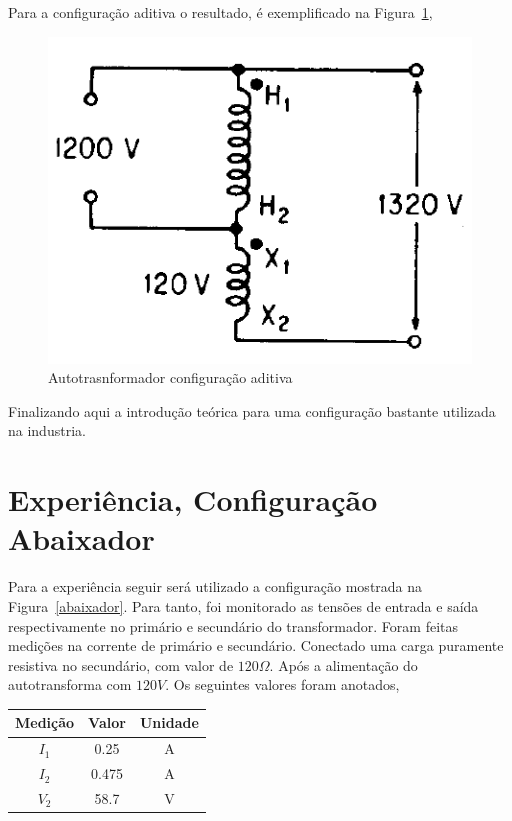 \documentclass[paper=a4, fontsize=11pt]{article}
\begin{document}
Para a configuração aditiva o resultado, é exemplificado na Figura~\ref{isolador2},

\begin{figure}[!ht]
    \centering
    \includegraphics[scale=.4]{isolado2.png}
    \caption{Autotrasnformador configuração aditiva}
    \label{isolador2}
\end{figure}

Finalizando aqui a introdução teórica para uma configuração bastante utilizada na
industria.

\section{Experiência, Configuração Abaixador}

Para a experiência seguir será utilizado a configuração mostrada na 
Figura~\ref{abaixador}. Para tanto, foi monitorado as tensões de entrada e saída
respectivamente no primário e secundário do transformador. Foram feitas medições
na corrente de primário e secundário. Conectado uma carga puramente resistiva
no secundário, com valor de $120 \Omega$. Após a alimentação do
autotransforma com $120 V$. Os seguintes valores foram anotados,

\begin{center}
    \begin{tabular}{c||c||c}
        Medição & Valor & Unidade \\
        \hline
        $I_1$ & 0.25 & A \\
        $I_2$ & 0.475 & A \\
        $V_2$ & 58.7 & V \\
    \end{tabular}
\end{center}
\end{document}
